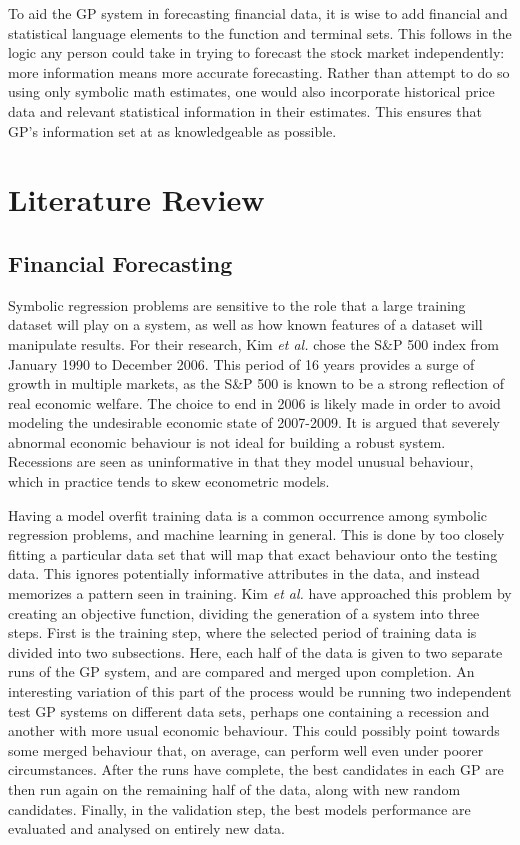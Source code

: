 \documentclass[12pt, letterpaper]{article}
\begin{document}
\textrm{ \indent To aid the GP system in forecasting financial data, it is wise to add financial and statistical language elements to the function and terminal sets. This follows in the logic any person could take in trying to forecast the stock market independently: more information means more accurate forecasting. Rather than attempt to do so using only symbolic math estimates, one would also incorporate historical price data and relevant statistical information in their estimates. This ensures that GP's information set at as knowledgeable as possible. }

\newpage 

\section{Literature Review}

\subsection{Financial Forecasting}

\textrm{ \indent Symbolic regression problems are sensitive to the role that a large training dataset will play on a system, as well as how known features of a dataset will manipulate results. For their research, Kim \textit{et al.} \cite{overfitting} chose the S\&P 500 index from January 1990 to December 2006. This period of 16 years provides a surge of growth in multiple markets, as the S\&P 500 is known to be a strong reflection of real economic welfare. The choice to end in 2006 is likely made in order to avoid modeling the undesirable economic state of 2007-2009. It is argued that severely abnormal economic behaviour is not ideal for building a robust system. Recessions are seen as uninformative in that they model unusual behaviour, which in practice tends to skew econometric models. }

\textrm{ \indent Having a model overfit training data is a common occurrence among symbolic regression problems, and machine learning in general. This is done by too closely fitting a particular data set that will map that exact behaviour onto the testing data. This ignores potentially informative attributes in the data, and instead memorizes a pattern seen in training. Kim \textit{et al.} \cite{overfitting} have approached this problem by creating an objective function, dividing the generation of a system into three steps. First is the training step, where the selected period of training data is divided into two subsections. Here, each half of the data is given to two separate runs of the GP system, and are compared and merged upon completion. An interesting variation of this part of the process would be running two independent test GP systems on different data sets, perhaps one containing a recession and another with more usual economic behaviour. This could possibly point towards some merged behaviour that, on average, can perform well even under poorer circumstances. After the runs have complete, the best candidates in each GP are then run again on the remaining half of the data, along with new random candidates. Finally, in the validation step, the best models performance are evaluated and analysed on entirely new data. }
\end{document}
